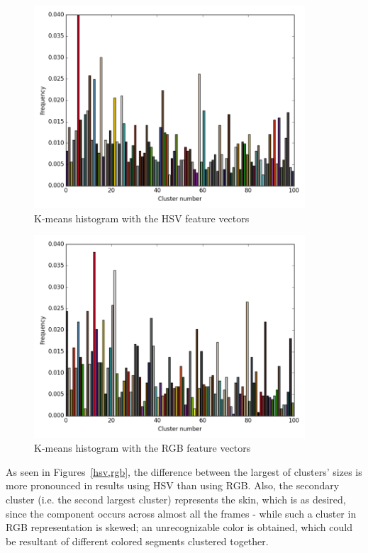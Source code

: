 \documentclass[10pt,twocolumn,letterpaper]{article}
\begin{document}
\begin{figure}[H]
  \centering
  \includegraphics[width=0.9\textwidth]{hsv.png}
  \caption{K-means histogram with the HSV feature vectors}
  \label{hsv}
\end{figure}

\begin{figure}[H]
  \centering
  \includegraphics[width=0.9\textwidth]{rgb.png}
  \caption{K-means histogram with the RGB feature vectors}
  \label{rgb}
\end{figure}



As seen in Figures~\ref{hsv,rgb}, the difference between the largest
of clusters’ sizes is more pronounced in results using HSV than using
RGB. Also, the secondary cluster (i.e. the second largest cluster)
represents the skin, which is as desired, since the component occurs
across almost all the frames - while such a cluster in RGB
representation is skewed; an unrecognizable color is obtained, which
could be resultant of different colored segments clustered together.
\end{document}
